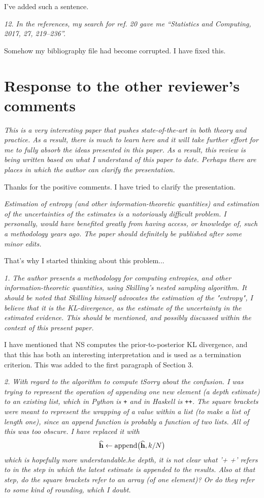 \documentclass[a4paper, 12pt]{article}
\renewcommand{\quote}{\em \color{orange}}
\begin{document}
I've added such a sentence.

{\quote
12. In the references, my search for ref. 20 gave me “Statistics and Computing, 2017, 27, 219–236”.}

Somehow my bibliography file had become corrupted. I have fixed this.

\section*{Response to the other reviewer's comments}

{\quote
This is a very interesting paper that pushes state-of-the-art in both theory and practice.  As a result, there is much to learn here and it will take further effort for me to fully absorb the ideas presented in this paper.  As a result, this review is being written based on what I understand of this paper to date.  Perhaps there are places in which the author can clarify the presentation.}

Thanks for the positive comments. I have tried to clarify the presentation.

{\quote
Estimation of entropy (and other information-theoretic quantities) and estimation of the uncertainties of the estimates is a notoriously difficult problem.  I personally, would have benefited greatly from having access, or knowledge of, such a methodology years ago.  The paper should definitely be published after some minor edits.}

That's why I started thinking about this problem...

{\quote
1. The author presents a methodology for computing entropies, and other information-theoretic quantities, using Skilling's nested sampling algorithm.  It should be noted that Skilling himself advocates the estimation of the "entropy", I believe that it is the KL-divergence, as the estimate of the uncertainty in the estimated evidence.  This should be mentioned, and possibly discussed within the context of this present paper.}

I have mentioned that NS computes the prior-to-posterior KL divergence, and
that this has both an interesting interpretation and is used as a termination
criterion. This was added to the first paragraph of Section 3.

{\quote
2. With regard to the algorithm to compute tSorry about the confusion. I was trying to represent the operation of
appending one new element (a depth estimate)
to an existing list, which in Python is {\tt +}
and in Haskell is {\tt ++}. The square brackets were meant to represent
the wrapping of a value within a list (to make a list of length one),
since an append function is probably a function of two lists.
All of this was too obscure. I have replaced it with
\begin{align}
\widehat{\mathbf{h}} \leftarrow \textnormal{append}\big(\widehat{\mathbf{h}}, k/N\big)
\end{align}
which is hopefully more understandable.he depth, it is not clear what '+ +' refers to in the step in which the latest estimate is appended to the results.  Also at that step, do the square brackets refer to an array (of one element)?  Or do they refer to some kind of rounding, which I doubt.}
\end{document}
